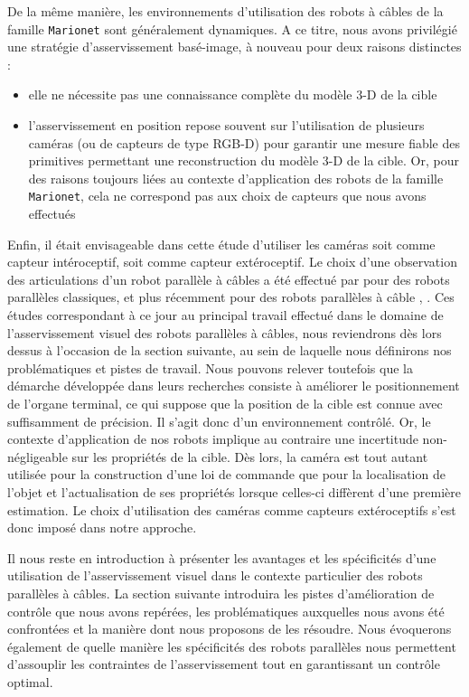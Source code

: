 De la même manière, les environnements d'utilisation des robots à câbles de la famille {\tt Marionet} sont généralement dynamiques. A ce titre, nous avons privilégié une stratégie d'asservissement basé-image, à nouveau pour deux raisons distinctes :
\begin{itemize}
\item elle ne nécessite pas une connaissance complète du modèle 3-D de la cible 
\item l'asservissement en position repose souvent sur l'utilisation de plusieurs caméras (ou de capteurs de type RGB-D) pour garantir une mesure fiable des primitives permettant une reconstruction du modèle 3-D de la cible. Or, pour des raisons toujours liées au contexte d'application des robots de la famille {\tt Marionet}, cela ne correspond pas aux choix de capteurs que nous avons effectués
\end{itemize}

Enfin, il était envisageable dans cette étude d'utiliser les caméras soit comme capteur intéroceptif, soit comme capteur extéroceptif. Le choix d'une observation des articulations d'un robot parallèle à câbles a été effectué par \cite{andreff2007} pour des robots parallèles classiques, et plus récemment pour des robots parallèles à câble \cite{dallej2011}, \cite{dallej2012}. Ces études correspondant à ce jour au principal travail effectué dans le domaine de l'asservissement visuel des robots parallèles à câbles, nous reviendrons dès lors dessus à l'occasion de la section suivante, au sein de laquelle nous définirons nos problématiques et pistes de travail. Nous pouvons relever toutefois que la démarche développée dans leurs recherches consiste à améliorer le positionnement de l'organe terminal, ce qui suppose que la position de la cible est connue avec suffisamment de précision. Il s'agit donc d'un environnement contrôlé. Or, le contexte d'application de nos robots implique au contraire une incertitude non-négligeable sur les propriétés de la cible. Dès lors, la caméra est tout autant utilisée pour la construction d'une loi de commande que pour la localisation de l'objet et l'actualisation de ses propriétés lorsque celles-ci diffèrent d'une première estimation. Le choix d'utilisation des caméras comme capteurs extéroceptifs s'est donc imposé dans notre approche.

Il nous reste en introduction à présenter les avantages et les spécificités d'une utilisation de l'asservissement visuel dans le contexte particulier des robots parallèles à câbles. La section suivante introduira les pistes d'amélioration de contrôle que nous avons repérées, les problématiques auxquelles nous avons été confrontées et la manière dont nous proposons de les résoudre. Nous évoquerons également de quelle manière les spécificités des robots parallèles nous permettent d'assouplir les contraintes de l'asservissement tout en garantissant un contrôle optimal.

